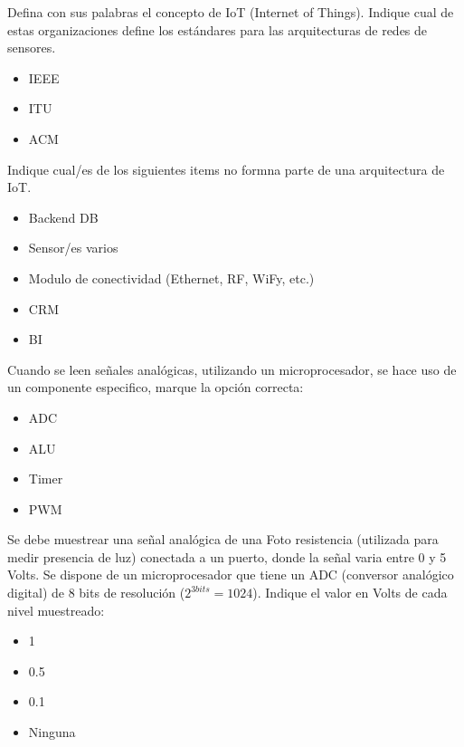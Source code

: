 \documentclass[11pt]{exam}
\begin{document}
%
%
%

\begin{questions}

\addpoints
\question[2] Defina con sus palabras el concepto de IoT (Internet of Things).
\vspace{4.5in}
\addpoints
\question[2] Indique cual de estas organizaciones define los estándares para las arquitecturas de redes de sensores.
\begin{itemize}
\item IEEE
\item ITU
\item ACM
\end{itemize}

\addpoints
\question[2] Indique cual/es de los siguientes items no formna parte de una arquitectura de IoT.
\begin{itemize}
\item Backend DB
\item Sensor/es varios
\item Modulo de conectividad (Ethernet, RF, WiFy, etc.)
\item CRM
\item BI
\end{itemize}
\newpage
\addpoints
\question[2] Cuando se leen señales analógicas, utilizando un microprocesador, se hace uso de un componente especifico, marque la opción correcta:
\begin{itemize}
\item ADC
\item ALU
\item Timer
\item PWM
\end{itemize}

\addpoints
\question[3] Se debe muestrear una señal analógica de una Foto resistencia (utilizada para medir presencia de luz) conectada a un puerto, donde la señal varia entre 0 y 5 Volts. Se dispone de un microprocesador que tiene un ADC (conversor analógico digital) de 8 bits de resolución ($2^{3bits}=1024$). Indique el valor en Volts de cada nivel muestreado:
\begin{itemize}
\item 1
\item 0.5
\item 0.1
\item Ninguna
\end{itemize}


\end{questions}
\end{document}
